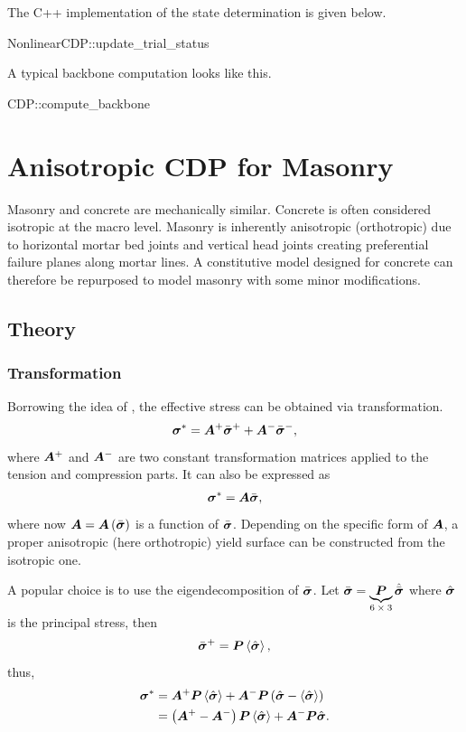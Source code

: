 The C++ implementation of the state determination is given below.
\begin{cppcode}
NonlinearCDP::update_trial_status
\end{cppcode}

A typical backbone computation looks like this.
\begin{cppcode}
CDP::compute_backbone
\end{cppcode}
\section{Anisotropic CDP for Masonry}
Masonry and concrete are mechanically similar.
Concrete is often considered isotropic at the macro level.
Masonry is inherently anisotropic (orthotropic) due to horizontal mortar bed joints and vertical head joints creating preferential failure planes along mortar lines.
A constitutive model designed for concrete can therefore be repurposed to model masonry with some minor modifications.
\subsection{Theory}
\subsubsection{Transformation}
Borrowing the idea of , the effective stress can be obtained via transformation.
\begin{gather}
    \bm{\sigma}^*=\bm{A}^+\bar{\bm{\sigma}}^++\bm{A}^-\bar{\bm{\sigma}}^-,
\end{gather}
where $\bm{A}^+$ and $\bm{A}^-$ are two constant transformation matrices applied to the tension and compression parts.
It can also be expressed as
\begin{gather}
    \bm{\sigma}^*=\bm{A}\bar{\bm{\sigma}},
\end{gather}
where now $\bm{A}=\bm{A}\left(\bar{\bm{\sigma}}\right)$ is a function of $\bar{\bm{\sigma}}$.
Depending on the specific form of $\bm{A}$, a proper anisotropic (here orthotropic) yield surface can be constructed from the isotropic one.

A popular choice is to use the eigendecomposition of $\bar{\bm{\sigma}}$.
Let $\bar\bsigma=\underbrace{\mb{P}}_\text{\numproduct{6x3}}\hat{\bar\bsigma}$ where $\hat{\bm{\sigma}}$ is the principal stress, then
\begin{gather}
    \bar{\bm{\sigma}}^+=\bm{P}\left\langle\hat{\bm{\sigma}}\right\rangle,
\end{gather}
thus,
\begin{gather}
    \begin{split}
    \bm{\sigma}^*&=\bm{A}^+\bm{P}\left\langle\hat{\bm{\sigma}}\right\rangle+\bm{A}^-\bm{P}\left(\hat{\bm{\sigma}}-\left\langle\hat{\bm{\sigma}}\right\rangle\right)\\
    &=\left(\bm{A}^+-\bm{A}^-\right)\bm{P}\left\langle\hat{\bm{\sigma}}\right\rangle+\bm{A}^-\bm{P}\hat{\bm{\sigma}}.
    \end{split}
\end{gather}
